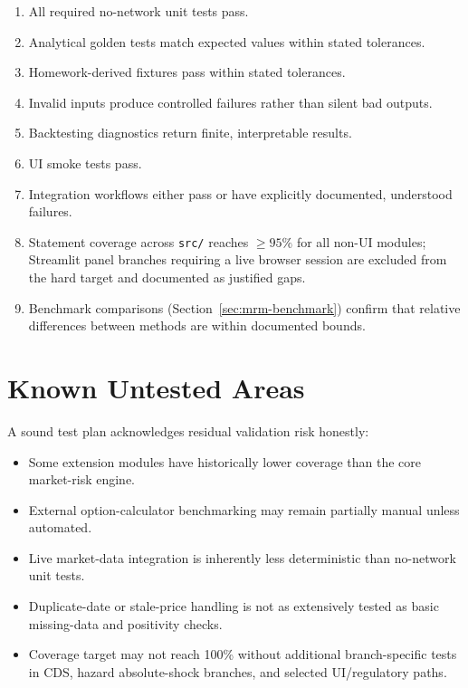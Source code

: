 \documentclass[11pt]{article}
\newcommand{\code}[1]{\texttt{#1}}
\begin{document}
\begin{enumerate}
  \item All required no-network unit tests pass.
  \item Analytical golden tests match expected values within stated tolerances.
  \item Homework-derived fixtures pass within stated tolerances.
  \item Invalid inputs produce controlled failures rather than silent bad outputs.
  \item Backtesting diagnostics return finite, interpretable results.
  \item UI smoke tests pass.
  \item Integration workflows either pass or have explicitly documented, understood failures.
  \item Statement coverage across \code{src/} reaches $\geq 95\%$ for all
    non-UI modules; Streamlit panel branches requiring a live browser session
    are excluded from the hard target and documented as justified gaps.
  \item Benchmark comparisons (Section~\ref{sec:mrm-benchmark}) confirm
    that relative differences between methods are within documented bounds.
\end{enumerate}

\section{Known Untested Areas}

A sound test plan acknowledges residual validation risk honestly:

\begin{itemize}
  \item Some extension modules have historically lower coverage than the
    core market-risk engine.
  \item External option-calculator benchmarking may remain partially manual
    unless automated.
  \item Live market-data integration is inherently less deterministic than
    no-network unit tests.
  \item Duplicate-date or stale-price handling is not as extensively tested
    as basic missing-data and positivity checks.
  \item Coverage target may not reach 100\% without additional branch-specific
    tests in CDS, hazard absolute-shock branches, and selected UI/regulatory
    paths.
\end{itemize}
\end{document}
